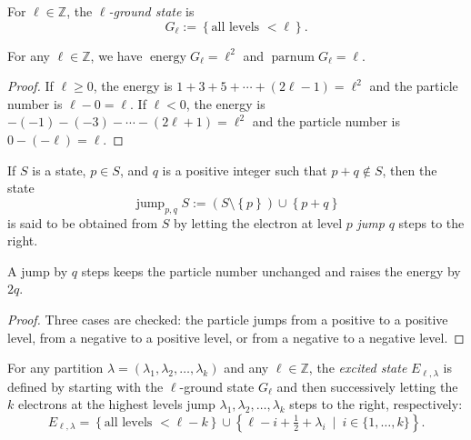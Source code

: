 \begin{definition}
\label{def.jtp.groundState}
\leanhelper
\leanok
For $\ell\in\mathbb{Z}$, the \emph{$\ell$-ground state} is
\[
G_{\ell}:=\left\{  \text{all levels }<\ell\right\}.
\]
\end{definition}

\begin{theorem}
\label{thm.jtp.groundState-energy-parnum}
\leanhelper
\leanok
For any $\ell\in\mathbb{Z}$, we have
$\operatorname{energy}G_{\ell}=\ell^{2}$ and
$\operatorname{parnum}G_{\ell}=\ell$.
\end{theorem}

\begin{proof}
\leanok
If $\ell\geq0$, the energy is
$1+3+5+\cdots+(2\ell-1)=\ell^{2}$
and the particle number is $\ell-0=\ell$.
If $\ell<0$, the energy is
$-(-1)-(-3)-\cdots-(2\ell+1)=\ell^{2}$
and the particle number is $0-(-\ell)=\ell$.
\end{proof}

\begin{definition}
\label{def.jtp.jump}
\leanhelper
\leanok
If $S$ is a state, $p\in S$, and $q$ is a positive integer such that
$p+q\notin S$, then the state
\[
\operatorname{jump}_{p,q}S:=\left(  S\setminus\left\{  p\right\}
\right)  \cup\left\{  p+q\right\}
\]
is said to be obtained from $S$ by letting the electron at level $p$
\emph{jump} $q$ steps to the right.
\end{definition}

\begin{theorem}
\label{thm.jtp.jump-parnum-energy}
\leanhelper
\leanok
A jump by $q$ steps keeps the particle number unchanged and raises the
energy by $2q$.
\end{theorem}

\begin{proof}
\leanok
Three cases are checked: the particle jumps from a positive to a
positive level, from a negative to a positive level, or from a negative
to a negative level.
\end{proof}

\begin{definition}
\label{def.jtp.excitedState}
\leanhelper
\leanok
For any partition $\lambda=(\lambda_{1},\lambda_{2},\ldots,\lambda_{k})$
and any $\ell\in\mathbb{Z}$, the \emph{excited state} $E_{\ell,\lambda}$
is defined by starting with the $\ell$-ground state $G_{\ell}$ and then
successively letting the $k$ electrons at the highest levels jump
$\lambda_{1},\lambda_{2},\ldots,\lambda_{k}$ steps to the right,
respectively:
\[
E_{\ell,\lambda}=\left\{  \text{all levels }<\ell-k\right\}  \cup\left\{
\ell-i+\tfrac{1}{2}+\lambda_{i}\ \mid\ i\in\{1,\ldots,k\}\right\}.
\]
\end{definition}

